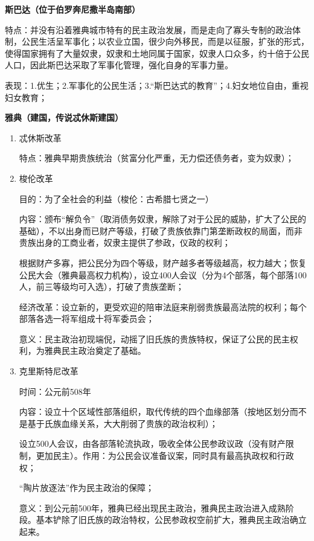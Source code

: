 \textbf{斯巴达（位于伯罗奔尼撒半岛南部）}

特点：并没有沿着雅典城市特有的民主政治发展，而是走向了寡头专制的政治体制，公民生活呈军事化；以农业立国，很少向外移民，而是以征服，扩张的形式，使得国家拥有了大量奴隶，奴隶和土地同属于国家，奴隶人口众多，约十倍于公民人口，因此斯巴达采取了军事化管理，强化自身的军事力量。

表现：1.优生；2.军事化的公民生活；3.“斯巴达式的教育”；4.妇女地位自由，重视妇女教育；

\textbf{雅典（建国，传说忒休斯建国）}

\begin{enumerate}
    \item 忒休斯改革
    
特点：雅典早期贵族统治（贫富分化严重，无力偿还债务者，变为奴隶）；
    \item 梭伦改革

目的：为了全社会的利益（梭伦：古希腊七贤之一）

内容：颁布“解负令”（取消债务奴隶，解除了对于公民的威胁，扩大了公民的基础），不以出身而已财产等级，打破了贵族依靠门第垄断政权的局面，而非贵族出身的工商业者，奴隶主提供了参政，仪政的权利；

根据财产多寡，把公民分为四个等级，财产越多者等级越高，权力越大；恢复公民大会（雅典最高权力机构），设立400人会议（分为4个部落，每个部落100人，前三等级均可入选），打破了贵族垄断；

经济改革：设立新的，更受欢迎的陪审法庭来削弱贵族最高法院的权利；每个部落各选一将军组成十将军委员会；

意义：民主政治初现端倪，动摇了旧氏族的贵族特权，保证了公民的民主权利，为雅典民主政治奠定了基础。

    \item 克里斯特尼改革  
    
时间：公元前508年

内容：设立十个区域性部落组织，取代传统的四个血缘部落（按地区划分而不是基于氏族血缘关系，大大削弱了贵族的政治权利）；

设立500人会议，由各部落轮流执政，吸收全体公民参政议政（没有财产限制，更加民主）。作用：为公民会议准备议案，同时具有最高执政权和行政权；

“陶片放逐法”作为民主政治的保障；

意义：到公元前500年，雅典已经出现民主政治，雅典民主政治进入成熟阶段。基本铲除了旧氏族的政治特权，公民参政权空前扩大，雅典民主政治确立起来。

\end{enumerate}

